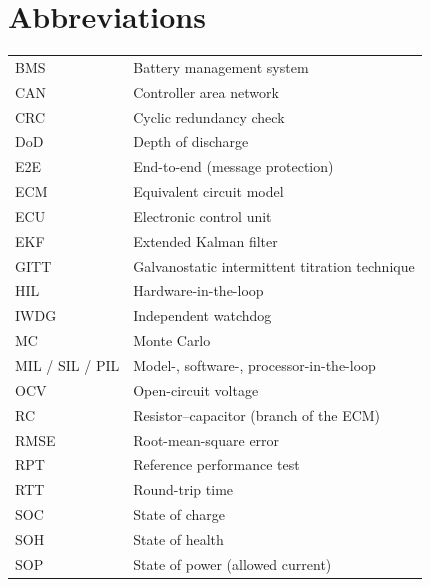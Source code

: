 \chapter*{Abbreviations}

\begin{tabular}{@{}ll@{}}
BMS & Battery management system \\
CAN & Controller area network \\
CRC & Cyclic redundancy check \\
DoD & Depth of discharge \\
E2E & End-to-end (message protection) \\
ECM & Equivalent circuit model \\
ECU & Electronic control unit \\
EKF & Extended Kalman filter \\
GITT & Galvanostatic intermittent titration technique \\
HIL & Hardware-in-the-loop \\
IWDG & Independent watchdog \\
MC & Monte Carlo \\
MIL / SIL / PIL & Model-, software-, processor-in-the-loop \\
OCV & Open-circuit voltage \\
RC & Resistor--capacitor (branch of the ECM) \\
RMSE & Root-mean-square error \\
RPT & Reference performance test \\
RTT & Round-trip time \\
SOC & State of charge \\
SOH & State of health \\
SOP & State of power (allowed current) \\
\end{tabular}
